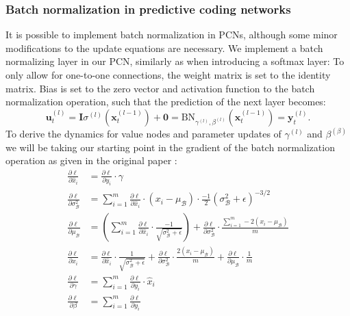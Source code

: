 \documentclass[a4paper,11pt]{article}
\begin{document}
\newpage 

\subsubsection{Batch normalization in predictive coding networks}
It is possible to implement batch normalization in PCNs, although some minor modifications to the update equations are necessary. We implement a batch normalizing layer in our PCN, similarly as when introducing a softmax layer: To only allow for one-to-one connections, the weight matrix is set to the identity matrix. Bias is set to the zero vector and activation function to the batch normalization operation, such that the prediction of the next layer becomes:
\begin{equation}
  \mathbf{u}_{t}^{(l)} = \mathbf{I} \sigma^{(l)}(\mathbf{x}_{t}^{(l-1)}) + \mathbf{0} = \text{BN}_{\gamma^{(l)},\beta^{(l)}}(\mathbf{x}_{t}^{(l-1)}) = \mathbf{y}_t^{(l)}.
\end{equation}
To derive the dynamics for value nodes and parameter updates of $\gamma^{(l)}$ and $\beta^{(\beta)}$ we will be taking our starting point in the gradient of the batch normalization operation as given in the original paper \cite{ioffe2015batch}:
\begin{equation}
  \begin{aligned}
    \frac{\partial \ell}{\partial \widehat{x}_{i}} &=\frac{\partial \ell}{\partial y_{i}} \cdot \gamma \\
    \frac{\partial \ell}{\partial \sigma_{\mathcal{B}}^{2}} &=\sum_{i=1}^{m} \frac{\partial \ell}{\partial \widehat{x}_{i}} \cdot\left(x_{i}-\mu_{\mathcal{B}}\right) \cdot \frac{-1}{2}\left(\sigma_{\mathcal{B}}^{2}+\epsilon\right)^{-3 / 2} \\
    \frac{\partial \ell}{\partial \mu_{\mathcal{B}}} &=\left(\sum_{i=1}^{m} \frac{\partial \ell}{\partial \widehat{x}_{i}} \cdot \frac{-1}{\sqrt{\sigma_{\mathcal{B}}^{2}+\epsilon}}\right)+\frac{\partial \ell}{\partial \sigma_{\mathcal{B}}^{2}} \cdot \frac{\sum_{i=1}^{m}-2\left(x_{i}-\mu_{\mathcal{B}}\right)}{m} \\
    \frac{\partial \ell}{\partial x_{i}} &=\frac{\partial \ell}{\partial \widehat{x}_{i}} \cdot \frac{1}{\sqrt{\sigma_{\mathcal{B}}^{2}+\epsilon}}+\frac{\partial \ell}{\partial \sigma_{\mathcal{B}}^{2}} \cdot \frac{2\left(x_{i}-\mu_{\mathcal{B}}\right)}{m}+\frac{\partial \ell}{\partial \mu_{\mathcal{B}}} \cdot \frac{1}{m} \\
    \frac{\partial \ell}{\partial \gamma} &=\sum_{i=1}^{m} \frac{\partial \ell}{\partial y_{i}} \cdot \widehat{x}_{i} \\
    \frac{\partial \ell}{\partial \beta} &=\sum_{i=1}^{m} \frac{\partial \ell}{\partial y_{i}}
  \end{aligned}
\end{equation}
\end{document}
